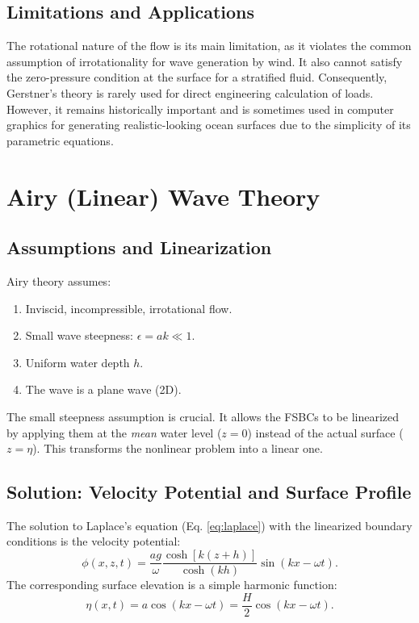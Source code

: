 \documentclass[11pt,letterpaper]{article}
\begin{document}
\subsection{Limitations and Applications}
The rotational nature of the flow is its main limitation, as it violates the common assumption of irrotationality for wave generation by wind. It also cannot satisfy the zero-pressure condition at the surface for a stratified fluid. Consequently, Gerstner's theory is rarely used for direct engineering calculation of loads. However, it remains historically important and is sometimes used in computer graphics for generating realistic-looking ocean surfaces due to the simplicity of its parametric equations.

\section{Airy (Linear) Wave Theory}
\subsection{Assumptions and Linearization}
Airy theory assumes:
\begin{enumerate}
    \item Inviscid, incompressible, irrotational flow.
    \item Small wave steepness: $\epsilon = ak \ll 1$.
    \item Uniform water depth $h$.
    \item The wave is a plane wave (2D).
\end{enumerate}
The small steepness assumption is crucial. It allows the FSBCs to be linearized by applying them at the \emph{mean} water level ($z=0$) instead of the actual surface ($z=\eta$). This transforms the nonlinear problem into a linear one.

\subsection{Solution: Velocity Potential and Surface Profile}
The solution to Laplace's equation (Eq. \ref{eq:laplace}) with the linearized boundary conditions is the velocity potential:
\begin{equation}
\phi(x,z,t) = \frac{a g}{\omega} \frac{\cosh[k(z+h)]}{\cosh(kh)} \sin(kx - \omega t).
\label{eq:airypotential}
\end{equation}
The corresponding surface elevation is a simple harmonic function:
\begin{equation}
\eta(x,t) = a \cos(kx - \omega t) = \frac{H}{2} \cos(kx - \omega t).
\label{eq:airyeta}
\end{equation}
\end{document}
